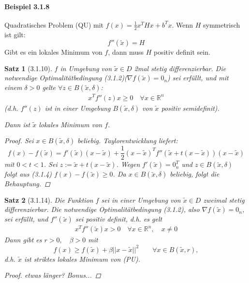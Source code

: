 \documentclass[ngerman,halfparskip]{scrartcl}
\newtheorem*{satz}{Satz}
\theoremstyle{definition}
\def\R{\mathbb R}
\begin{document}
\paragraph{Beispiel 3.1.8} Quadratisches Problem (QU) mit $f(x)=\frac12 x^THx+b^Tx$. Wenn $H$ symmetrisch ist gilt: $$f''(\tilde x)=H$$ Gibt es ein lokales Minimum von $f$, dann muss $H$ positiv definit sein.

\begin{satz}[3.1.10] $f$ in Umgebung von $\tilde x \in D$ 2mal stetig differenzierbar. Die notwendige Optimalitätbedingung (3.1.2)($\nabla f(\tilde x)=0_n$) sei erfüllt, und mit einem $\delta >0$ gelte $\forall z\in B(\tilde x, \delta)$:
\begin{gather}\tag{3.1.4} x^Tf''(z)x \geq 0 \quad \forall x\in\R^n\end{gather} (d.h. $f''(z)$ ist in einer Umgebung $B(\tilde x, \delta)$ von $\tilde x$ positiv semidefinit). 

Dann ist $\tilde x$ lokales Minimum von $f$.

\begin{proof}
Sei $x\in B(\tilde x,\delta)$ beliebig. Taylorentwicklung liefert: $$f(x)-f(\tilde x)=f'(\tilde x)(x-\tilde x)+\frac 12 (x-\tilde x)^Tf''(\tilde x + t(x-\tilde x))(x-\tilde x)$$ mit $0<t<1$. Sei $z:=\tilde x+t(x-\tilde x)$. Wegen $f'(\tilde x)=0_n^T$ und $z\in B(\tilde x,\delta)$ folgt aus (3.1.4) $f(x)-f(\tilde x)\geq 0$. Da $x\in B(\tilde x, \delta)$ beliebig, folgt die Behauptung.
\end{proof}
\end{satz}

\begin{satz}[3.1.14]
Die Funktion $f$ sei in einer Umgebung von $\tilde x \in D$ zweimal stetig differenzierbar. Die notwendige Optimalitätbedingung (3.1.2), also $\nabla f(\tilde x)=0_n$, sei erfüllt, und $f''(\tilde x)$ sei positiv definit, d.h. es gelt \begin{gather*}\tag{3.1.5}
x^Tf''(\tilde x)x >0 \quad \forall x\in \R^n,\quad x\neq 0
\end{gather*}
Dann gibt es $r>0,\quad \beta >0$ mit $$ f(x)\geq f(\tilde x) + \beta ||x-\tilde x||^2 \qquad \forall x\in B(\tilde x,r),$$ d.h. $\tilde x$ ist striktes lokales Minimum von (PU).
\begin{proof}
etwas länger? Bonus...
\end{proof}

\end{satz}
\end{document}
